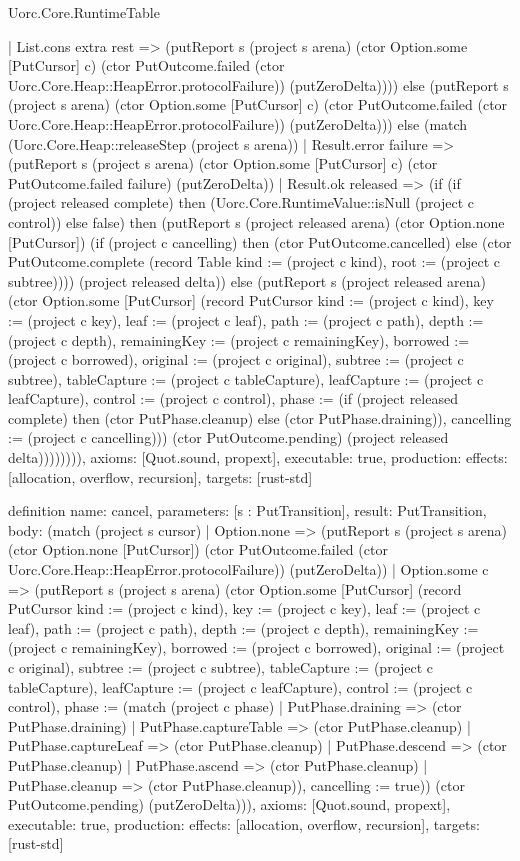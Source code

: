 \begin{lexlean}{Uorc.Core.RuntimeTable}
\begin{semanticmodule}
{          | List.cons extra rest => (putReport s (project s arena) (ctor Option.some [PutCursor] c) (ctor PutOutcome.failed (ctor Uorc.Core.Heap::HeapError.protocolFailure)) (putZeroDelta)))) else (putReport s (project s arena) (ctor Option.some [PutCursor] c) (ctor PutOutcome.failed (ctor Uorc.Core.Heap::HeapError.protocolFailure)) (putZeroDelta))) else (match (Uorc.Core.Heap::releaseStep (project s arena))
        | Result.error failure => (putReport s (project s arena) (ctor Option.some [PutCursor] c) (ctor PutOutcome.failed failure) (putZeroDelta))
        | Result.ok released => (if (if (project released complete) then (Uorc.Core.RuntimeValue::isNull (project c control)) else false) then (putReport s (project released arena) (ctor Option.none [PutCursor]) (if (project c cancelling) then (ctor PutOutcome.cancelled) else (ctor PutOutcome.complete (record Table {kind := (project c kind), root := (project c subtree)}))) (project released delta)) else (putReport s (project released arena) (ctor Option.some [PutCursor] (record PutCursor {kind := (project c kind), key := (project c key), leaf := (project c leaf), path := (project c path), depth := (project c depth), remainingKey := (project c remainingKey), borrowed := (project c borrowed), original := (project c original), subtree := (project c subtree), tableCapture := (project c tableCapture), leafCapture := (project c leafCapture), control := (project c control), phase := (if (project released complete) then (ctor PutPhase.cleanup) else (ctor PutPhase.draining)), cancelling := (project c cancelling)})) (ctor PutOutcome.pending) (project released delta)))))))),
  axioms: [Quot.sound, propext],
  executable: true,
  production: {effects: [allocation, overflow, recursion], targets: [rust-std]}
}

definition{
  name: cancel,
  parameters: [s : PutTransition],
  result: PutTransition,
  body: (match (project s cursor)
    | Option.none => (putReport s (project s arena) (ctor Option.none [PutCursor]) (ctor PutOutcome.failed (ctor Uorc.Core.Heap::HeapError.protocolFailure)) (putZeroDelta))
    | Option.some c => (putReport s (project s arena) (ctor Option.some [PutCursor] (record PutCursor {kind := (project c kind), key := (project c key), leaf := (project c leaf), path := (project c path), depth := (project c depth), remainingKey := (project c remainingKey), borrowed := (project c borrowed), original := (project c original), subtree := (project c subtree), tableCapture := (project c tableCapture), leafCapture := (project c leafCapture), control := (project c control), phase := (match (project c phase)
      | PutPhase.draining => (ctor PutPhase.draining)
      | PutPhase.captureTable => (ctor PutPhase.cleanup)
      | PutPhase.captureLeaf => (ctor PutPhase.cleanup)
      | PutPhase.descend => (ctor PutPhase.cleanup)
      | PutPhase.ascend => (ctor PutPhase.cleanup)
      | PutPhase.cleanup => (ctor PutPhase.cleanup)), cancelling := true})) (ctor PutOutcome.pending) (putZeroDelta))),
  axioms: [Quot.sound, propext],
  executable: true,
  production: {effects: [allocation, overflow, recursion], targets: [rust-std]}
}


\end{semanticmodule}
\end{lexlean}
